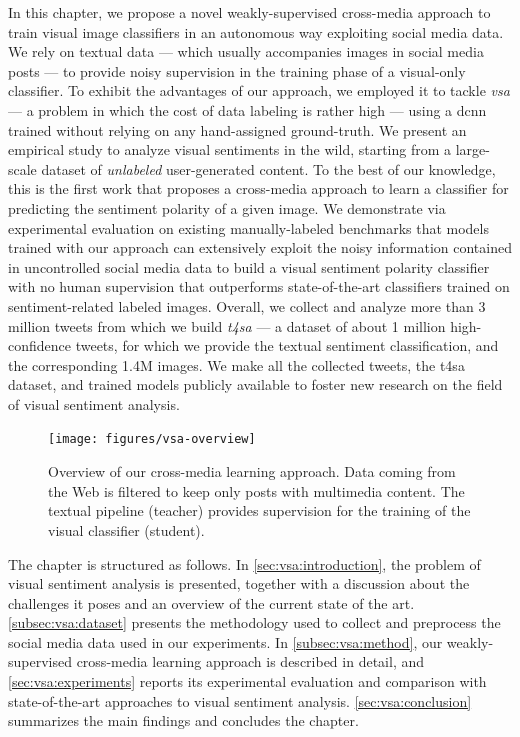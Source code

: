 In this chapter, we propose a novel weakly-supervised cross-media approach to train visual image classifiers in an autonomous way exploiting social media data.
We rely on textual data --- which usually accompanies images in social media posts --- to provide noisy supervision in the training phase of a visual-only classifier.
To exhibit the advantages of our approach, we employed it to tackle \emph{\gls{vsa}} --- a problem in which the cost of data labeling is rather high --- using a \acrfull{dcnn} trained without relying on any hand-assigned ground-truth.
We present an empirical study to analyze visual sentiments in the wild, starting from a large-scale dataset of \emph{unlabeled} user-generated content.
To the best of our knowledge, this is the first work that proposes a cross-media approach to learn a classifier for predicting the sentiment polarity of a given image.
We demonstrate via experimental evaluation on existing manually-labeled benchmarks that models trained with our approach can extensively exploit the noisy information contained in uncontrolled social media data to build a visual sentiment polarity classifier with no human supervision that outperforms state-of-the-art classifiers trained on sentiment-related labeled images.
Overall, we collect and analyze more than 3 million tweets from which we build \emph{\acrfull{t4sa}} --- a dataset of about 1 million high-confidence tweets, for which we provide the textual sentiment classification, and the corresponding 1.4M images.
We make all the collected tweets, the \gls{t4sa} dataset, and trained models publicly available to foster new research on the field of visual sentiment analysis.

\begin{figure}
    \centering
    \texttt{[image: figures/vsa-overview]}
    \caption{Overview of our cross-media learning approach.
    Data coming from the Web is filtered to keep only posts with multimedia content.
    The textual pipeline (teacher) provides supervision for the training of the visual classifier (student).}
    \label{fig:vsa:overview}
\end{figure}

The chapter is structured as follows.
In \ref{sec:vsa:introduction}, the problem of visual sentiment analysis is presented, together with a discussion about the challenges it poses and an overview of the current state of the art.
\ref{subsec:vsa:dataset} presents the methodology used to collect and preprocess the social media data used in our experiments.
In \ref{subsec:vsa:method}, our weakly-supervised cross-media learning approach is described in detail, and \ref{sec:vsa:experiments} reports its experimental evaluation and comparison with state-of-the-art approaches to visual sentiment analysis.
\ref{sec:vsa:conclusion} summarizes the main findings and concludes the chapter.

